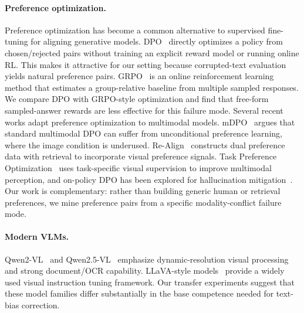 \paragraph{Preference optimization.}
Preference optimization has become a common alternative to supervised fine-tuning for aligning generative models.
DPO~\cite{rafailov2023dpo} directly optimizes a policy from chosen/rejected pairs without training an explicit reward model or running online RL.
This makes it attractive for our setting because corrupted-text evaluation yields natural preference pairs.
GRPO~\cite{shao2024deepseekmath} is an online reinforcement learning method that estimates a group-relative baseline from multiple sampled responses.
We compare DPO with GRPO-style optimization and find that free-form sampled-answer rewards are less effective for this failure mode.
Several recent works adapt preference optimization to multimodal models.
mDPO~\cite{wang2024mdpo} argues that standard multimodal DPO can suffer from unconditional preference learning, where the image condition is underused.
Re-Align~\cite{xing2025realign} constructs dual preference data with retrieval to incorporate visual preference signals.
Task Preference Optimization~\cite{yan2025tpo} uses task-specific visual supervision to improve multimodal perception, and on-policy DPO has been explored for hallucination mitigation~\cite{yang2025hallucinationdpo}.
Our work is complementary: rather than building generic human or retrieval preferences, we mine preference pairs from a specific modality-conflict failure mode.

\paragraph{Modern VLMs.}
Qwen2-VL~\cite{wang2024qwen2vl} and Qwen2.5-VL~\cite{bai2025qwen25vl} emphasize dynamic-resolution visual processing and strong document/OCR capability.
LLaVA-style models~\cite{liu2023llava,liu2024llavanext} provide a widely used visual instruction tuning framework.
Our transfer experiments suggest that these model families differ substantially in the base competence needed for text-bias correction.
